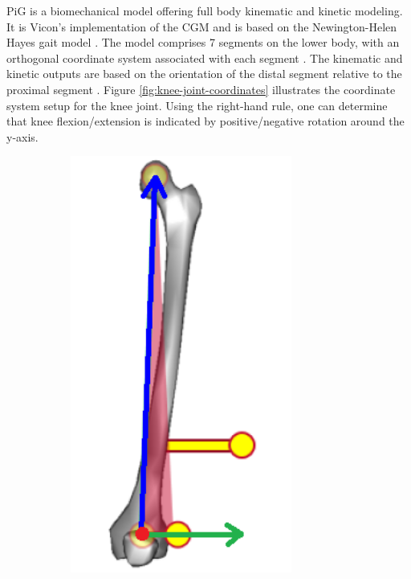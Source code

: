 \documentclass[../main.tex]{subfiles}
\begin{document}
\Ac{PiG} is a biomechanical model offering full body kinematic and kinetic modeling. 
It is Vicon's implementation of the \ac{CGM} and is based on the Newington-Helen Hayes gait model \cite{vicon-user-guide, viconpig}. 
The model  comprises 7 segments on the lower body, with an orthogonal coordinate system associated with each segment \cite{Baker2017}.
The kinematic and kinetic outputs are based on the orientation of the distal segment relative to the proximal segment \cite{Leboeuf2019, Baker2017, cgm-outputs}. 
Figure \ref{fig:knee-joint-coordinates} illustrates the coordinate system setup for the knee joint.
Using the right-hand rule, one can determine that knee flexion/extension is indicated by positive/negative rotation around the y-axis.
\begin{figure}[!htb]
    \centering
    \begin{subfigure}[t]{0.3\textwidth}
        \centering
        \includegraphics[width=0.8\textwidth]{img/LeftFootFemur_PiG_wCoord.png}

\end{subfigure}
\end{figure}
\end{document}
